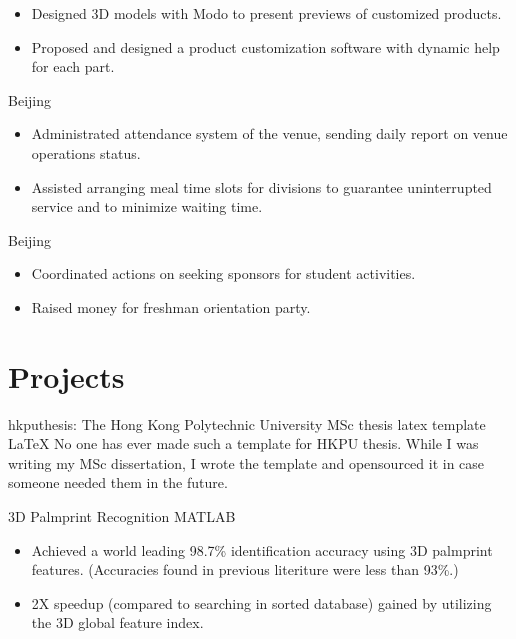 \documentclass[10pt,a4paper]{moderncv/moderncv}
\begin{document}
{
\begin{itemize}
	\item Designed 3D models with Modo to present previews of customized products.
	\item Proposed and designed a product customization software with dynamic help for each part.
\end{itemize}
}

{Beijing}{}
{
\begin{itemize}
	\item Administrated attendance system of the venue, sending daily report on venue operations status.
	\item Assisted arranging meal time slots for divisions to guarantee uninterrupted service and to minimize waiting time.
\end{itemize}
}

{Beijing}{}
{
\begin{itemize}
	\item Coordinated actions on seeking sponsors for student activities.
	\item Raised money for freshman orientation party.
\end{itemize}
}

\section{Projects}

% 
% 
{hkputhesis: The Hong Kong Polytechnic University MSc thesis latex template}
{LaTeX}
{}{}
{
No one has ever made such a template for HKPU thesis. While I was writing my MSc dissertation, I wrote the template and opensourced it in case someone needed them in the future.
}

{3D Palmprint Recognition}
{MATLAB}
{}{}
{
\begin{itemize}
	\item Achieved a world leading 98.7\% identification accuracy using 3D palmprint features. (Accuracies found in previous literiture were less than 93\%.)
	\item 2X speedup (compared to searching in sorted database) gained by utilizing the 3D global feature index.
\end{itemize}
}
\end{document}
